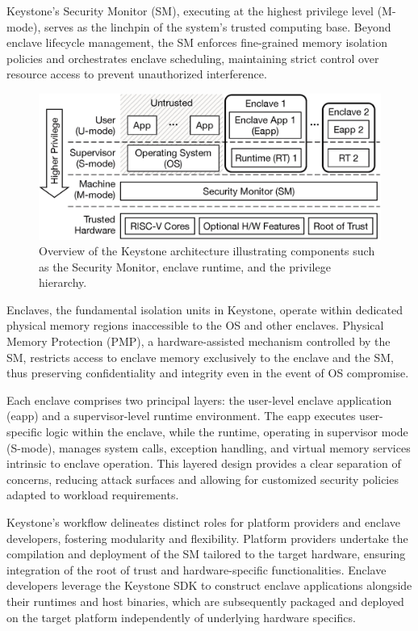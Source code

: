 Keystone’s Security Monitor (SM), executing at the highest privilege level (M-mode), serves as the linchpin of the system’s trusted computing base. Beyond enclave lifecycle management, the SM enforces fine-grained memory isolation policies and orchestrates enclave scheduling, maintaining strict control over resource access to prevent unauthorized interference.

\begin{figure}[htbp]
    \centering
    \includegraphics[width=0.9\linewidth]{figures/keystone_overview.png}
    \caption{Overview of the Keystone architecture illustrating components such as the Security Monitor, enclave runtime, and the privilege hierarchy.}
    \label{fig:keystone_overview}
\end{figure}

Enclaves, the fundamental isolation units in Keystone, operate within dedicated physical memory regions inaccessible to the OS and other enclaves. Physical Memory Protection (PMP), a hardware-assisted mechanism controlled by the SM, restricts access to enclave memory exclusively to the enclave and the SM, thus preserving confidentiality and integrity even in the event of OS compromise.

Each enclave comprises two principal layers: the user-level enclave application (eapp) and a supervisor-level runtime environment. The eapp executes user-specific logic within the enclave, while the runtime, operating in supervisor mode (S-mode), manages system calls, exception handling, and virtual memory services intrinsic to enclave operation. This layered design provides a clear separation of concerns, reducing attack surfaces and allowing for customized security policies adapted to workload requirements.

Keystone’s workflow delineates distinct roles for platform providers and enclave developers, fostering modularity and flexibility. Platform providers undertake the compilation and deployment of the SM tailored to the target hardware, ensuring integration of the root of trust and hardware-specific functionalities. Enclave developers leverage the Keystone SDK to construct enclave applications alongside their runtimes and host binaries, which are subsequently packaged and deployed on the target platform independently of underlying hardware specifics.

